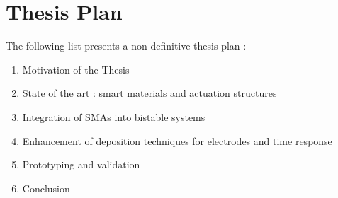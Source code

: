 \section{Thesis Plan}
The following list presents a non-definitive thesis plan :
\begin{enumerate}
  \item Motivation of the Thesis
  \item State of the art : smart materials and actuation structures
  \item Integration of SMAs into bistable systems
  \item Enhancement of deposition techniques for electrodes and time response
  \item Prototyping and validation
  \item Conclusion
\end{enumerate}
